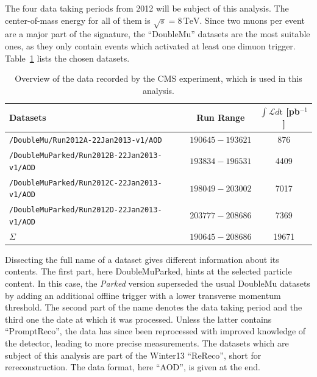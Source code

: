The four data taking periods from 2012 will be subject of this analysis. The center-of-mass energy for all of them is $\sqrt{s} = 8\,\text{TeV}$. Since two muons per event are a major part of the signature, the ``DoubleMu'' datasets are the most suitable ones, as they only contain events which activated at least one dimuon trigger. Table~\ref{tab:data} lists the chosen datasets.

\begin{table}[!ht]
  \centering
  \begin{tabular}{|l|c|c|}
    \hline
    Datasets                                         & Run Range         & $\int \mathcal{L} d\text{t}$ [pb$^{-1}$] \\ \hline \hline
    \verb+/DoubleMu/Run2012A-22Jan2013-v1/AOD+\footnotemark       & $190645 - 193621$ & 876                            \\ \hline
    \verb+/DoubleMuParked/Run2012B-22Jan2013-v1/AOD+ & $193834 - 196531$ & 4409                           \\ \hline
    \verb+/DoubleMuParked/Run2012C-22Jan2013-v1/AOD+ & $198049 - 203002$ & 7017                           \\ \hline
    \verb+/DoubleMuParked/Run2012D-22Jan2013-v1/AOD+ & $203777 - 208686$ & 7369                           \\ \hline
    $\Sigma$                                         & $190645 - 208686$ & 19671                          \\ \hline
  \end{tabular}
  \caption{Overview of the data recorded by the CMS experiment, which is used in this analysis.}
  \label{tab:data}
\end{table}


Dissecting the full name of a dataset gives different information about its contents. The first part, here DoubleMuParked, hints at the selected particle content. In this case, the \textit{Parked} version superseded the usual DoubleMu datasets by adding an additional offline trigger with a lower transverse momentum threshold. The second part of the name denotes the data taking period and the third one the date at which it was processed. Unless the latter contains ``PromptReco'', the data has since been reprocessed with improved knowledge of the detector, leading to more precise measurements. The datasets which are subject of this analysis are part of the Winter13 ``ReReco'', short for rereconstruction. The data format, here ``AOD'', is given at the end.

